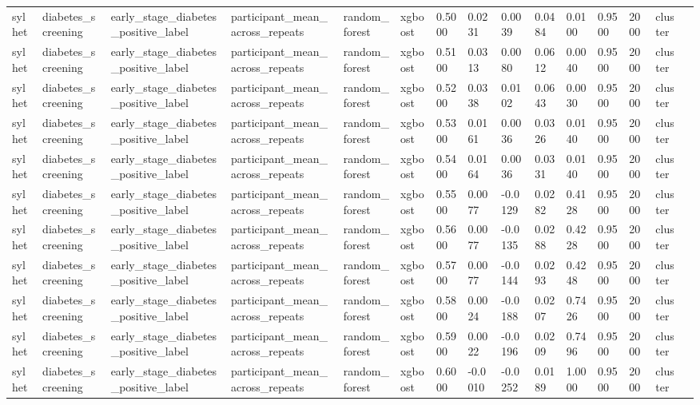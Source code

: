 \begin{tabular}{lllllllllllllll}
sylhet & diabetes\_screening & early\_stage\_diabetes\_positive\_label & participant\_mean\_across\_repeats & random\_forest & xgboost & 0.5000 & 0.0231 & 0.0039 & 0.0484 & 0.0100 & 0.9500 & 2000 & cluster &  \\
sylhet & diabetes\_screening & early\_stage\_diabetes\_positive\_label & participant\_mean\_across\_repeats & random\_forest & xgboost & 0.5100 & 0.0313 & 0.0080 & 0.0612 & 0.0040 & 0.9500 & 2000 & cluster &  \\
sylhet & diabetes\_screening & early\_stage\_diabetes\_positive\_label & participant\_mean\_across\_repeats & random\_forest & xgboost & 0.5200 & 0.0338 & 0.0102 & 0.0643 & 0.0030 & 0.9500 & 2000 & cluster &  \\
sylhet & diabetes\_screening & early\_stage\_diabetes\_positive\_label & participant\_mean\_across\_repeats & random\_forest & xgboost & 0.5300 & 0.0161 & 0.0036 & 0.0326 & 0.0140 & 0.9500 & 2000 & cluster &  \\
sylhet & diabetes\_screening & early\_stage\_diabetes\_positive\_label & participant\_mean\_across\_repeats & random\_forest & xgboost & 0.5400 & 0.0164 & 0.0036 & 0.0331 & 0.0140 & 0.9500 & 2000 & cluster &  \\
sylhet & diabetes\_screening & early\_stage\_diabetes\_positive\_label & participant\_mean\_across\_repeats & random\_forest & xgboost & 0.5500 & 0.0077 & -0.0129 & 0.0282 & 0.4128 & 0.9500 & 2000 & cluster &  \\
sylhet & diabetes\_screening & early\_stage\_diabetes\_positive\_label & participant\_mean\_across\_repeats & random\_forest & xgboost & 0.5600 & 0.0077 & -0.0135 & 0.0288 & 0.4228 & 0.9500 & 2000 & cluster &  \\
sylhet & diabetes\_screening & early\_stage\_diabetes\_positive\_label & participant\_mean\_across\_repeats & random\_forest & xgboost & 0.5700 & 0.0077 & -0.0144 & 0.0293 & 0.4248 & 0.9500 & 2000 & cluster &  \\
sylhet & diabetes\_screening & early\_stage\_diabetes\_positive\_label & participant\_mean\_across\_repeats & random\_forest & xgboost & 0.5800 & 0.0024 & -0.0188 & 0.0207 & 0.7426 & 0.9500 & 2000 & cluster &  \\
sylhet & diabetes\_screening & early\_stage\_diabetes\_positive\_label & participant\_mean\_across\_repeats & random\_forest & xgboost & 0.5900 & 0.0022 & -0.0196 & 0.0209 & 0.7496 & 0.9500 & 2000 & cluster &  \\
sylhet & diabetes\_screening & early\_stage\_diabetes\_positive\_label & participant\_mean\_across\_repeats & random\_forest & xgboost & 0.6000 & -0.0010 & -0.0252 & 0.0189 & 1.0000 & 0.9500 & 2000 & cluster &  \\

\end{tabular}
